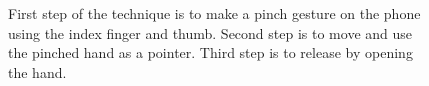 \begin{figure}[H]
\caption{\protect{} First step of the \pinch technique is to make a pinch gesture on the phone using the index finger and thumb. \protect{} Second step is to move and use the pinched hand as a pointer. \protect{} Third step is to release by opening the hand.}
\label{fig:pinchTechnique}
\end{figure}

